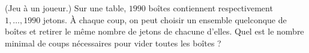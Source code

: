 (Jeu à un joueur.) Sur une table, $1990$ boîtes contiennent respectivement $1, \ldots, 1990$ jetons. À chaque coup, on peut choisir un ensemble quelconque de boîtes et retirer le même nombre de jetons de chacune d'elles. Quel est le nombre minimal de coups nécessaires pour vider toutes les boîtes ?

